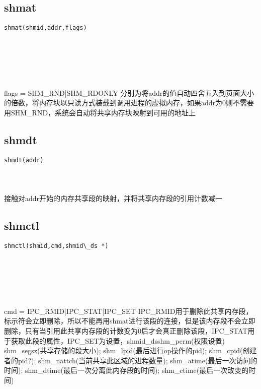 \documentclass[10pt,a4paper]{article}
\begin{document}
\subsection{shmat}
\begin{spacing}{2.0}
\lstset{language=C,numbers=none}
\begin{lstlisting}
shmat(shmid,addr,flags)
\end{lstlisting}
{\large\color[rgb]{0.2,0.4,0.6}{shmid:}} \\
{\large\color[rgb]{0.2,0.4,0.6}{addr:}} \\
{\large\color[rgb]{0.2,0.4,0.6}{flags:}}
\paragraph{ \ \ }flags = SHM\_RND|SHM\_RDONLY 分别为将addr的值自动四舍五入到页面大小的倍数，将内存块以只读方式装载到调用进程的虚拟内存，如果addr为0则不需要用SHM\_RND，系统会自动将共享内存块映射到可用的地址上
\end{spacing}

\subsection{shmdt}
\begin{spacing}{2.0}
\lstset{language=C,numbers=none}
\begin{lstlisting}
shmdt(addr)
\end{lstlisting}
{\large\color[rgb]{0.2,0.4,0.6}{addr:}}
\paragraph{ \ \ }接触对addr开始的内存共享段的映射，并将共享内存段的引用计数减一
\end{spacing}

\subsection{shmctl}
\begin{spacing}{2.0}
\lstset{language=C,numbers=none}
\begin{lstlisting}
shmctl(shmid,cmd,shmid\_ds *)
\end{lstlisting}
{\large\color[rgb]{0.2,0.4,0.6}{shmid:}} \\
{\large\color[rgb]{0.2,0.4,0.6}{cmd:}} \\
{\large\color[rgb]{0.2,0.4,0.6}{*:}}
\paragraph{ \ \ }cmd = IPC\_RMID|IPC\_STAT|IPC\_SET  IPC\_RMID用于删除此共享内存段，标示符会立即删除，所以不能再用shmat进行该段的连接，但是该内存段不会立即删除，只有当引用此共享内存段的计数变为0后才会真正删除该段，IPC\_STAT用于获取此段的属性，IPC\_SET为设置，shmid\_ds{shm\_perm(权限设置) shm\_segsz(共享存储的段大小); shm\_lpid(最后进行op操作的pid); shm\_cpid(创建者的pid?); shm\_nattch(当前共享此区域的进程数量); shm\_atime(最后一次访问的时间); shm\_dtime(最后一次分离此内存段的时间); shm\_ctime(最后一次改变的时间)}
\end{spacing}
\end{document}
